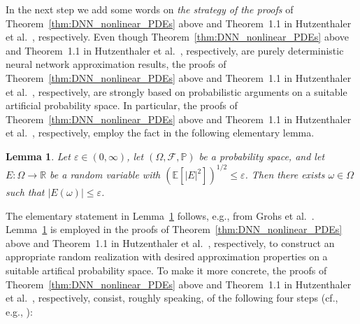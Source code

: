 \documentclass[12pt,AutoFakeBold,AutoFakeSlant]{article}
\newtheorem{lemma}{Lemma}
\theoremstyle{definition}
\newcommand{\R}{\mathbb{R}}
\renewcommand{\P}{\mathbb{P}}
\newcommand{\E}{\mathbb{E}}
\begin{document}
	In the next step we add some words on 
	\emph{the strategy 
	of the proofs} of 
	Theorem~\ref{thm:DNN_nonlinear_PDEs} above 
	and 
	Theorem~1.1 in Hutzenthaler et al.~\cite{hutzenthaler2020proof}, 
	respectively. Even though 
	Theorem~\ref{thm:DNN_nonlinear_PDEs} above
	and 
	Theorem~1.1 in Hutzenthaler et al.~\cite{hutzenthaler2020proof}, respectively, 
	are purely deterministic neural network 
	approximation results, 
	the proofs of 
	Theorem~\ref{thm:DNN_nonlinear_PDEs} above 
	and 
	Theorem~1.1 in Hutzenthaler et al.~\cite{hutzenthaler2020proof}, 
	respectively, are strongly based on 
	probabilistic arguments on a suitable 
	artificial probability space. 
	In particular, the proofs of 
	Theorem~\ref{thm:DNN_nonlinear_PDEs} above 
	and 
	Theorem~1.1 in Hutzenthaler et al.~\cite{hutzenthaler2020proof}, 
	respectively, 
	employ the fact in the following elementary lemma. 
	\begin{lemma}
	\label{lem:elementary}
	Let $ \varepsilon \in (0,\infty) $, 
	let $ ( \Omega, \mathcal{F}, \P ) $ be a probability space, 
	and 
	let $ E \colon \Omega \to \R $ be a random variable 
	with $ ( \E[ | E |^2 ] )^{ 1 / 2  } \leq \varepsilon $. 
	Then there exists $ \omega \in \Omega $ such that 
	$ | E( \omega ) | \leq \varepsilon $.
	\end{lemma}
	The elementary statement in Lemma~\ref{lem:elementary} follows, e.g., 
	from Grohs et al.~\cite[Proposition~3.3]{grohs2018proof}.
	Lemma~\ref{lem:elementary} is employed in the proofs of 
	Theorem~\ref{thm:DNN_nonlinear_PDEs} above 
	and 
	Theorem~1.1 in Hutzenthaler et al.~\cite{hutzenthaler2020proof}, 
	respectively, 
	to construct an appropriate random realization 
	with desired approximation properties 
	on a suitable artifical probability space. 
	To make it more concrete, 
	the proofs of 
	Theorem~\ref{thm:DNN_nonlinear_PDEs} above 
	and 
	Theorem~1.1 in Hutzenthaler et al.~\cite{hutzenthaler2020proof}, respectively,  
	consist, roughly speaking, of the following 
	four steps (cf., e.g., \cite[Section~1]{jentzen2018proofarxiv1809}):
\end{document}
